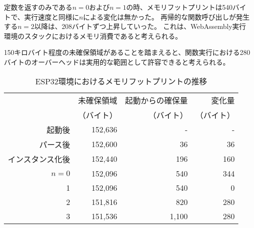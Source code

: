 定数を返すのみである$n=0$および$n=1$の時、メモリフットプリントは540バイトで、実行速度と同様に$n$による変化は無かった。
再帰的な関数呼び出しが発生する$n=2$以降は、208バイトずつ上昇していった。
これは、WebAssembly実行環境のスタックにおけるメモリ消費であると考えられる。

150キロバイト程度の未確保領域があることを踏まえると、関数実行における280バイトのオーバーヘッドは実用的な範囲として許容できると考えられる。

\begin{table}[htbp]
  \caption{ESP32環境におけるメモリフットプリントの推移}
  \label{tab:heap_size}
  \begin{center}
    \begin{tabular}{rrrr}
      \hline
      & 未確保領域 & 起動からの確保量 & 変化量 \\
      & （バイト） & （バイト） & （バイト） \\ \hline \hline
      起動後      & 152,636 & - & - \\ \hline
      パース後     & 152,600 & 36 & 36 \\ \hline
      インスタンス化後 & 152,440  & 196 & 160 \\ \hline
      $n=0$  & 152,096 &   540 & 344 \\ \hline
      1  & 152,096 &   540 &   0 \\ \hline
      2  & 151,816 &   820 & 280 \\ \hline
      3  & 151,536 & 1,100 & 280 \\ \hline

\end{tabular}
\end{center}
\end{table}
